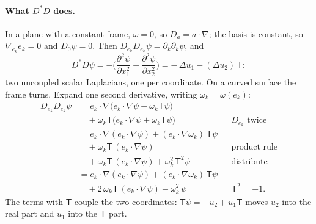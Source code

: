\paragraph{What $D^*D$ does.} In a plane with a constant frame, $\omega = 0$, so $D_a = a\cdot\nabla$; the basis is constant, so $\nabla_{e_k}e_k = 0$ and $D_0\psi = 0$. Then $D_{e_k}D_{e_k}\psi = \partial_k\partial_k\psi$, and
\begin{equation*}
D^*D\psi = -\Big(\frac{\partial^2\psi}{\partial x_1^2} + \frac{\partial^2\psi}{\partial x_2^2}\Big) = -\,\Delta u_1 - (\Delta u_2)\,\mathsf T :
\end{equation*}
two uncoupled scalar Laplacians, one per coordinate. On a curved surface the frame turns. Expand one second derivative, writing $\omega_k = \omega(e_k)$:
\begin{align*}
D_{e_k}D_{e_k}\psi &= e_k\cdot\nabla\big(e_k\cdot\nabla\psi + \omega_k\mathsf T\psi\big) \\
&\quad + \omega_k\mathsf T\big(e_k\cdot\nabla\psi + \omega_k\mathsf T\psi\big) && D_{e_k} \text{ twice} \\
&= e_k\cdot\nabla(e_k\cdot\nabla\psi) + (e_k\cdot\nabla\omega_k)\,\mathsf T\psi \\
&\quad + \omega_k\mathsf T\,(e_k\cdot\nabla\psi) && \text{product rule} \\
&\quad + \omega_k\mathsf T\,(e_k\cdot\nabla\psi) + \omega_k^2\,\mathsf T^2\psi && \text{distribute} \\
&= e_k\cdot\nabla(e_k\cdot\nabla\psi) + (e_k\cdot\nabla\omega_k)\,\mathsf T\psi \\
&\quad + 2\,\omega_k\mathsf T\,(e_k\cdot\nabla\psi) - \omega_k^2\,\psi && \mathsf T^2 = -1 .
\end{align*}
The terms with $\mathsf T$ couple the two coordinates: $\mathsf T\psi = -u_2 + u_1\mathsf T$ moves $u_2$ into the real part and $u_1$ into the $\mathsf T$ part.

